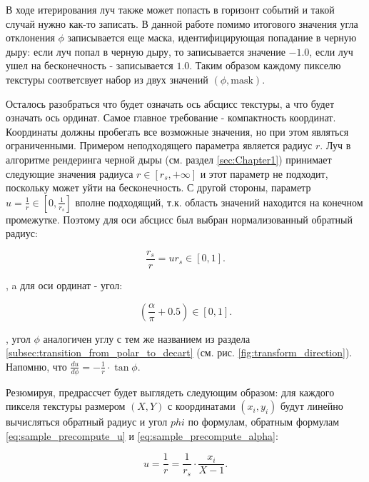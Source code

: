 В ходе итерирования луч также может попасть в горизонт событий и такой случай нужно как-то записать. В данной работе помимо итогового значения угла отклонения $\phi$ записывается еще маска, идентифицирующая попадание в черную дыру: если луч попал в черную дыру, то записывается значение $-1.0$, если луч ушел на бесконечность - записывается $1.0$. Таким образом каждому пикселю текстуры соответсвует набор из двух значений $\left(\phi, \text{mask}\right)$.

Осталось разобраться что будет означать ось абсцисс текстуры, а что будет означать ось ординат. Самое главное требование - компактность координат. Координаты должны пробегать все возможные значения, но при этом являться ограниченными. Примером неподходящего параметра является радиус $r$. Луч в алгоритме рендеринга черной дыры (см. раздел \ref{sec:Chapter1}) принимает следующие значения радиуса $r \in \left[r_{s}, +\infty\right]$ и этот параметр не подходит, поскольку может уйти на бесконечность. С другой стороны, параметр $u=\frac{1}{r} \in \left[0, \frac{1}{r_s}\right]$ вполне подходящий, т.к. область значений находится на конечном промежутке. Поэтому для оси абсцисс был выбран нормализованный обратный радиус:

\begin{equation}
\label{eq:sample_precompute_u}
    \frac{r_s}{r}=ur_s \in [0, 1].
\end{equation}

, a для оси ординат - угол:

\begin{equation}
\label{eq:sample_precompute_alpha}
    \left(\frac{\alpha}{\pi} + 0.5\right) \in \left[0, 1\right].
\end{equation}

, угол $\phi$ аналогичен углу с тем же названием из раздела \ref{subsec:transition_from_polar_to_decart} (см. рис. \ref{fig:transform_direction}). Напомню, что $\frac{du}{d\phi} = -\frac{1}{r} \cdot \tan{\phi}$.

Резюмируя, предрассчет будет выглядеть следующим образом: для каждого пикселя текстуры размером $(X, Y)$ с координатами $(x_i, y_i)$ будут линейно вычисляться обратный радиус и угол $phi$ по формулам, обратным формулам \eqref{eq:sample_precompute_u} и \eqref{eq:sample_precompute_alpha}:

\begin{equation}
\label{eq:precompute_u}
    u = \frac{1}{r} = \frac{1}{r_s} \cdot \frac{x_i}{X - 1}.
\end{equation}

